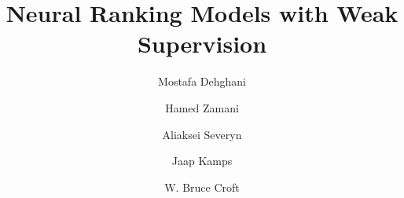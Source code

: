\documentclass[sigconf]{acmart}
\begin{document}
\title{Neural Ranking Models with Weak Supervision} 


\author{Mostafa Dehghani}

\author{Hamed Zamani}

\author{Aliaksei Severyn}


\author{Jaap Kamps}

\author{W. Bruce Croft}

\renewcommand{\shortauthors}{M. Dehghani et al.}

\newcommand{\maingoal}{to study the impact of weak supervision on neural ranking models}
\newcommand{\rqone}{Is it possible to learn a neural ranker only from labels provided by a completely unsupervised IR model such as BM25, as the weak supervision signal, that will exhibit superior generalization capabilities?}
\newcommand{\rqtwo}{What input representation and learning objective is most suitable for learning in such a setting?}
\newcommand{\rqthree}{Can a supervised learning model benefit from a weak supervision step, especially in cases when labeled data is limited?}
\renewcommand{\rqone}{Can labels from an unsupervised IR model such as BM25 be used as weak supervision signal to train an effective neural ranker?}
\end{document}
